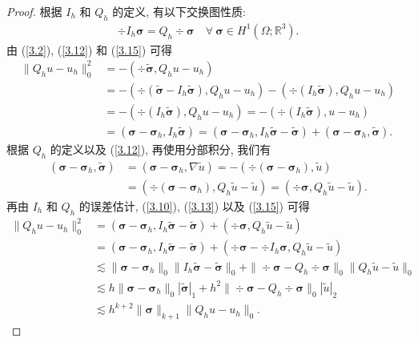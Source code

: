 	\begin{proof}
		根据 $I_h$ 和 $Q_h$ 的定义, 有以下交换图性质:
		\begin{align}
			\label{3.15}
			\div I_h\boldsymbol\sigma=Q_h\div\boldsymbol\sigma \quad \forall \ \boldsymbol\sigma\in H^1(\Omega;\mathbb{R}^3).
		\end{align}
		由 (\ref{3.2}), (\ref{3.12}) 和 (\ref{3.15}) 可得
		\begin{align*}
			\|Q_h u-u_h\|^2_0&=-(\div\widetilde{\boldsymbol{\sigma}}, Q_h u-u_h)\\
			&=-(\div(\widetilde{\boldsymbol{\sigma}}-I_h\widetilde{\boldsymbol{\sigma}}),Q_h u-u_h)-(\div(I_h\widetilde{\boldsymbol{\sigma}}),Q_h u-u_h)\\
			&=-(\div(I_h\widetilde{\boldsymbol{\sigma}}),Q_h u-u_h)=-(\div(I_h\widetilde{\boldsymbol{\sigma}}),u-u_h)\\
			&=(\boldsymbol\sigma-\boldsymbol\sigma_h,I_h\widetilde{\boldsymbol{\sigma}})=(\boldsymbol\sigma-\boldsymbol\sigma_h,I_h\widetilde{\boldsymbol{\sigma}}-\widetilde{\boldsymbol{\sigma}})+(\boldsymbol\sigma-\boldsymbol\sigma_h,\widetilde{\boldsymbol{\sigma}}).
		\end{align*}
		根据 $Q_h$ 的定义以及 (\ref{3.12}), 再使用分部积分, 我们有
		\begin{align*}
			(\boldsymbol\sigma-\boldsymbol\sigma_h,\widetilde{\boldsymbol{\sigma}})&=(\boldsymbol\sigma-\boldsymbol\sigma_h,\nabla\widetilde{u})=-(\div(\boldsymbol\sigma-\boldsymbol\sigma_h),\widetilde{u})\\
			&=(\div(\boldsymbol\sigma-\boldsymbol\sigma_h),Q_h\widetilde{u}-\widetilde{u})=(\div\boldsymbol\sigma,Q_h\widetilde{u}-\widetilde{u}).
		\end{align*}
		再由 $I_h$ 和 $Q_h$ 的误差估计, (\ref{3.10}), (\ref{3.13}) 以及 (\ref{3.15}) 可得
		\begin{align*}
			\|Q_h u-u_h\|^2_0&=(\boldsymbol\sigma-\boldsymbol\sigma_h,I_h\widetilde{\boldsymbol{\sigma}}-\widetilde{\boldsymbol{\sigma}})+(\div\boldsymbol\sigma,Q_h\widetilde{u}-\widetilde{u})\\
			&=(\boldsymbol\sigma-\boldsymbol\sigma_h,I_h\widetilde{\boldsymbol{\sigma}}-\widetilde{\boldsymbol{\sigma}})+(\div\boldsymbol\sigma-\div I_h\boldsymbol\sigma,Q_h\widetilde{u}-\widetilde{u})\\
			&\lesssim\|\boldsymbol\sigma-\boldsymbol\sigma_h\|_0\|I_h\widetilde{\boldsymbol{\sigma}}-\widetilde{\boldsymbol{\sigma}}\|_0+\|\div\boldsymbol\sigma-Q_h\div\boldsymbol\sigma\|_0\|Q_h\widetilde{u}-\widetilde{u}\|_0\\
			&\lesssim h\|\boldsymbol\sigma-\boldsymbol\sigma_h\|_0|\widetilde{\boldsymbol{\sigma}}|_1+h^2\|\div\boldsymbol\sigma-Q_h\div\boldsymbol\sigma\|_0|\widetilde{u}|_2\\
			&\lesssim h^{k+2}\|\boldsymbol\sigma\|_{k+1}\|Q_h u-u_h\|_0.
		\end{align*}
	\end{proof}
	
